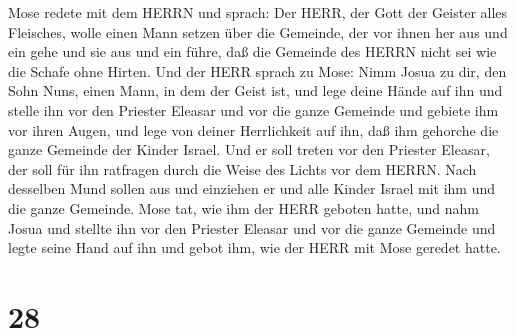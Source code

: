 Mose redete mit dem HERRN und sprach:  Der HERR, der Gott
der Geister alles Fleisches, wolle einen Mann setzen über die Gemeinde,
 der vor ihnen her aus und ein gehe und sie aus und ein
führe, daß die Gemeinde des HERRN nicht sei wie die Schafe ohne Hirten.
 Und der HERR sprach zu Mose: Nimm Josua zu dir, den Sohn
Nuns, einen Mann, in dem der Geist ist, und lege deine Hände auf ihn
 und stelle ihn vor den Priester Eleasar und vor die ganze
Gemeinde und gebiete ihm vor ihren Augen,  und lege von
deiner Herrlichkeit auf ihn, daß ihm gehorche die ganze Gemeinde der
Kinder Israel.  Und er soll treten vor den Priester
Eleasar, der soll für ihn ratfragen durch die Weise des Lichts vor dem
HERRN. Nach desselben Mund sollen aus und einziehen er und alle Kinder
Israel mit ihm und die ganze Gemeinde.  Mose tat, wie ihm
der HERR geboten hatte, und nahm Josua und stellte ihn vor den Priester
Eleasar und vor die ganze Gemeinde  und legte seine Hand
auf ihn und gebot ihm, wie der HERR mit Mose geredet hatte.

\hypertarget{section-27}{%
\section{28}\label{section-27}}

